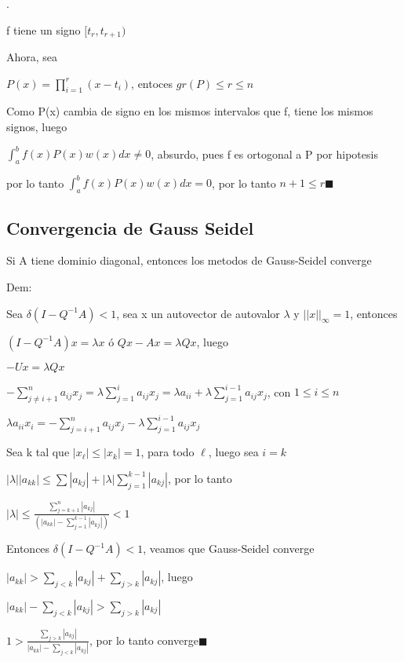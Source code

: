 \documentclass{article}
\begin{document}
.

f tiene un signo $[t_r,t_{r+1})$

Ahora, sea

$P(x)= \prod\limits_{i=1}^{r}(x-t_i) $, entoces $gr(P) \leq r \leq n$

Como P(x) cambia de signo en los mismos intervalos que f, tiene los mismos signos, luego

$\displaystyle\int_{a}^{b} f(x)P(x)w(x)dx \not= 0$, absurdo, pues f es ortogonal a P por hipotesis

por lo tanto $\displaystyle\int_{a}^{b}f(x)P(x)w(x)dx = 0$, por lo tanto $n+1 \leq r$$\blacksquare$


\vspace{10mm}





\subsection{Convergencia de Gauss Seidel}\label{Convergencia-de-Gauss-Seidel}

Si A tiene dominio diagonal, entonces los metodos  de Gauss-Seidel converge

Dem:

Sea $\delta(I-Q^{-1}A)<1$, sea x un autovector de autovalor $\lambda$ y $||x||_\infty=1$, entonces

$(I-Q^{-1}A)x = \lambda x$ ó $Qx-Ax = \lambda Qx$, luego

$-Ux = \lambda Qx$

$-\sum\limits_{j \not= i+1}^{n}a_{ij}x_j = \lambda \sum\limits_{j=1}^{i}a_{ij}x_j = \lambda a_{ii}+\lambda \sum\limits_{j=1}^{i-1}a_{ij}x_j$, con $1 \leq i \leq n$

$\lambda a_{ii}x_i = -\sum\limits_{j=i+1}^{n}a_{ij}x_j-\lambda\sum\limits_{j=1}^{i-1}a_{ij}x_j$

Sea k tal que $|x_\ell| \leq |x_k|=1$, para todo $\ell$, luego sea $i=k$

\vspace{5mm}

$|\lambda||a_{kk}| \leq \sum\limits|a_{kj}|+|\lambda|\sum\limits_{j=1}^{k-1}|a_{kj}|$, por lo tanto

$|\lambda| \leq \displaystyle\frac{\sum\limits_{j=k+1}^{n}|a_{kj}|}{(|a_{kk}|-\sum\limits_{j=1}^{k-1}|a_{kj}|)} < 1$

Entonces $\delta(I-Q^{-1}A)<1$, veamos que Gauss-Seidel converge

\vspace{5mm}

$|a_{kk}| > \sum\limits_{j<k}|a_{kj}|+\sum\limits_{j>k}|a_{kj}|$, luego

\vspace{5mm}

$|a_{kk}|-\sum\limits_{j<k}|a_{kj}| > \sum\limits_{j>k}|a_{kj}|$

\vspace{5mm}

$1 > \displaystyle\frac{ \sum\limits_{j>k}|a_{kj}|}{|a_{kk}|-\sum\limits_{j<k}|a_{kj}|} $, por lo tanto converge$\blacksquare$



\vspace{10mm}
\end{document}
